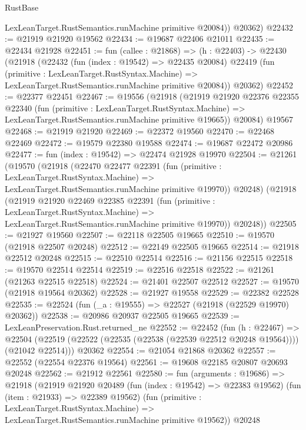\begin{lexlean}{RustBase}
\begin{coremodule}
        LexLeanTarget.RustSemantics.runMachine primitive @20084))
      @20362)
@22432 := @21919 @21920 @19562
@22434 := @19687 @22406 @21011
@22435 := @22434 @21928
@22451 := fun (callee : @21868) =>
  (h : @22403) ->
  @22430
    (@21918
      (@22432
        (fun (index : @19542) => @22435 @20084)
        @22419
        (fun (primitive : LexLeanTarget.RustSyntax.Machine) =>
        LexLeanTarget.RustSemantics.runMachine primitive @20084))
      @20362)
@22452 := @22377 @22451
@22467 := @19556
    (@21918
      (@21919
        @21920
        @22376
        @22355
        @22340
        (fun (primitive : LexLeanTarget.RustSyntax.Machine) =>
        LexLeanTarget.RustSemantics.runMachine primitive @19665))
      @20084)
    @19567
@22468 := @21919 @21920
@22469 := @22372 @19560
@22470 := @22468 @22469
@22472 := @19579 @22380 @19588
@22474 := @19687 @22472 @20986
@22477 := fun (index : @19542) => @22474 @21928 @19970
@22504 := @21261
    (@19570
      (@21918
        (@22470
          @22477
          @22391
          (fun (primitive : LexLeanTarget.RustSyntax.Machine) =>
          LexLeanTarget.RustSemantics.runMachine primitive @19970))
        @20248)
      (@21918
        (@21919
          @21920
          @22469
          @22385
          @22391
          (fun (primitive : LexLeanTarget.RustSyntax.Machine) =>
          LexLeanTarget.RustSemantics.runMachine primitive @19970))
        @20248))
@22505 := @21927 @19560
@22507 := @22118 @22505 @19665
@22510 := @19570 (@21918 @22507 @20248)
@22512 := @22149 @22505 @19665
@22514 := @21918 @22512 @20248
@22515 := @22510 @22514
@22516 := @21156 @22515
@22518 := @19570 @22514 @22514
@22519 := @22516 @22518
@22522 := @21261 (@21263 @22515 @22518)
@22524 := @21401 @22507 @22512
@22527 := @19570 (@21918 @19564 @20362)
@22528 := @21927 @19558
@22529 := @22382 @22528
@22535 := @22524 (fun (_a : @19555) => @22527 (@21918 (@22529 @19970) @20362))
@22538 := @20986 @20937 @22505 @19665
@22539 := LexLeanPreservation.Rust.returned_ne
@22552 := @22452
    (fun (h : @22467) =>
    @22504 (@22519 (@22522 (@22535 (@22538 (@22539 @22512 @20248 @19564)))) (@21042 @22514)))
    @20362
@22554 := @21054 @21868 @20362
@22557 := @22552 (@22554 @22376 @19564)
@22561 := @19608 @22185 @20807 @20693 @20248
@22562 := @21912 @22561
@22580 := fun (arguments : @19686) =>
  @21918
    (@21919
      @21920
      @20489
      (fun (index : @19542) => @22383 @19562)
      (fun (item : @21933) => @22389 @19562)
      (fun (primitive : LexLeanTarget.RustSyntax.Machine) =>
      LexLeanTarget.RustSemantics.runMachine primitive @19562))
    @20248

\end{coremodule}
\end{lexlean}
